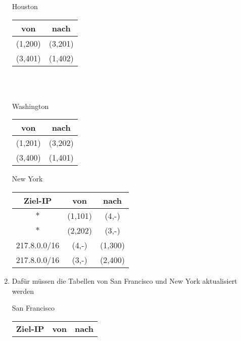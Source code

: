 \documentclass{article}
\begin{document}
\begin{enumerate}[label=(\alph*)]
		\begin{minipage}[t]{0.3\textwidth}
			\begin{center}
				Houston \\
				\begin{tabular}{c|c}
					\textbf{von} & \textbf{nach} \\
					\hline
					(1,200) & (3,201) \\
					(3,401) & (1,402)
				\end{tabular}
			\end{center}
		\end{minipage} \\
		\vspace{0.2cm} \\
		\begin{minipage}[t]{0.45\textwidth}
			\begin{center}
				Washington \\
				\begin{tabular}{c|c}
					\textbf{von} & \textbf{nach} \\
					\hline
					(1,201) & (3,202) \\
					(3,400) & (1,401)
				\end{tabular}
			\end{center}
		\end{minipage}
		\begin{minipage}[t]{0.45\textwidth}
			\begin{center}
				New York \\
				\begin{tabular}{c|c|c}
					\textbf{Ziel-IP} & \textbf{von} & \textbf{nach} \\
					\hline
					$\ast$ & (1,101)  & (4,-) \\
					$\ast$ & (2,202) & (3,-) \\
					217.8.0.0/16 & (4,-) & (1,300) \\
					217.8.0.0/16 & (3,-) & (2,400)
				\end{tabular}
			\end{center}
		\end{minipage}
		\item Dafür müssen die Tabellen von San Francisco und New York aktualisiert werden \\
		\begin{minipage}[t]{0.45\textwidth}
			\begin{center}
				San Francisco \\
				\begin{tabular}{c|c|c}
					\textbf{Ziel-IP} & \textbf{von} & \textbf{nach} \\

\end{tabular}
\end{center}
\end{minipage}
\end{enumerate}
\end{document}

